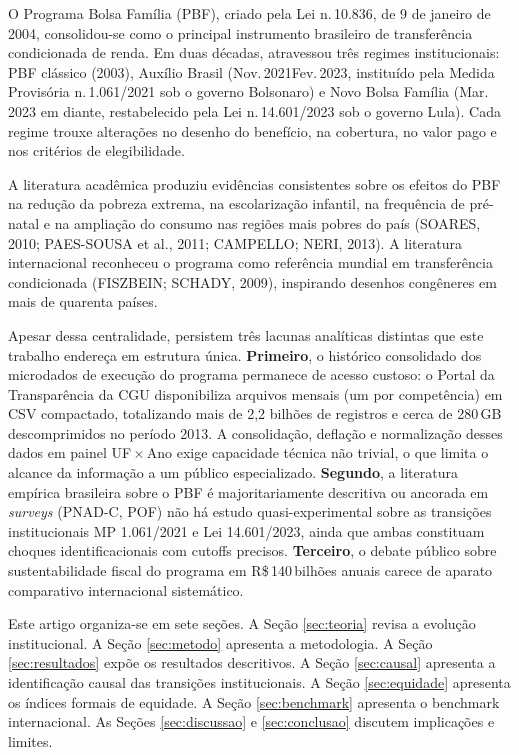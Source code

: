 \documentclass[12pt,a4paper,oneside]{article}
\newcommand{\rs}{R\$\,}
\begin{document}
O Programa Bolsa Família (PBF), criado pela Lei n.\,10.836, de 9 de
janeiro de 2004, consolidou-se como o principal instrumento brasileiro
de transferência condicionada de renda. Em duas décadas, atravessou
três regimes institucionais: PBF clássico (2003),
Auxílio Brasil (Nov.\,2021\textendash Fev.\,2023, instituído pela
Medida Provisória n.\,1.061/2021 sob o governo Bolsonaro) e Novo
Bolsa Família (Mar.\,2023 em diante, restabelecido pela Lei
n.\,14.601/2023 sob o governo Lula). Cada regime trouxe alterações
no desenho do benefício, na cobertura, no valor pago e nos critérios
de elegibilidade.

A literatura acadêmica produziu evidências consistentes sobre os
efeitos do PBF na redução da pobreza extrema, na escolarização
infantil, na frequência de pré-natal e na ampliação do consumo nas
regiões mais pobres do país (SOARES, 2010; PAES-SOUSA et al., 2011; CAMPELLO; NERI, 2013). A literatura internacional reconheceu o
programa como referência mundial em transferência
condicionada (FISZBEIN; SCHADY, 2009), inspirando desenhos congêneres
em mais de quarenta países.

Apesar dessa centralidade, persistem três lacunas analíticas
distintas que este trabalho endereça em estrutura única.
\textbf{Primeiro}, o histórico consolidado dos microdados de
execução do programa permanece de acesso custoso: o Portal da
Transparência da CGU disponibiliza arquivos mensais (um por
competência) em CSV compactado, totalizando mais de 2,2 bilhões de
registros e cerca de 280\,GB descomprimidos no período
2013. A consolidação, deflação e normalização
desses dados em painel UF\,$\times$\,Ano exige capacidade técnica
não trivial, o que limita o alcance da informação a um público
especializado. \textbf{Segundo}, a literatura empírica brasileira
sobre o PBF é majoritariamente descritiva ou ancorada em
\textit{surveys} (PNAD-C, POF) \textemdash{} não há estudo
quasi-experimental sobre as transições institucionais MP 1.061/2021
e Lei 14.601/2023, ainda que ambas constituam choques
identificacionais com cutoffs precisos. \textbf{Terceiro}, o debate
público sobre sustentabilidade fiscal do programa em \rs 140\,bilhões
anuais carece de aparato comparativo internacional sistemático.

Este artigo organiza-se em sete seções. A Seção
\ref{sec:teoria} revisa a evolução institucional. A Seção
\ref{sec:metodo} apresenta a metodologia. A Seção
\ref{sec:resultados} expõe os resultados descritivos. A Seção
\ref{sec:causal} apresenta a identificação causal das transições
institucionais. A Seção \ref{sec:equidade} apresenta os índices
formais de equidade. A Seção \ref{sec:benchmark} apresenta o
benchmark internacional. As Seções \ref{sec:discussao} e
\ref{sec:conclusao} discutem implicações e limites.
\end{document}
